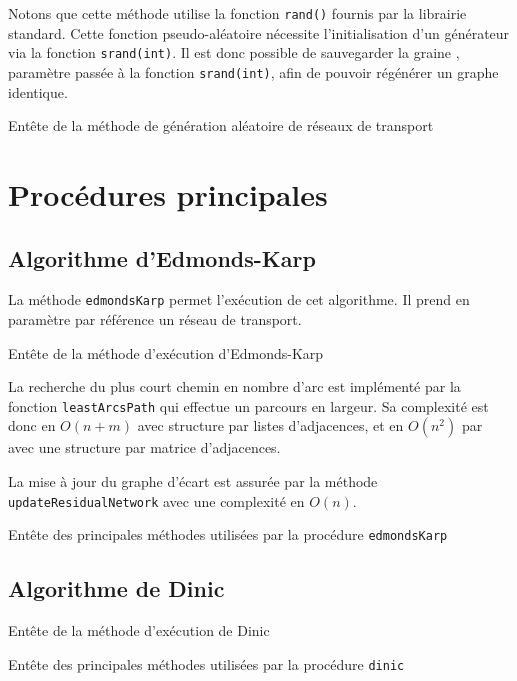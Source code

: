 Notons que cette méthode utilise la fonction \texttt{rand()} fournis par la librairie standard. Cette fonction \og pseudo-aléatoire \fg nécessite l'initialisation d'un générateur via la fonction \texttt{srand(int)}. Il est donc possible de sauvegarder la \og graine \fg, paramètre passée à la fonction \texttt{srand(int)}, afin de pouvoir régénérer un graphe identique.

Entête de la méthode de génération aléatoire de réseaux de transport


\section{Procédures principales}

\subsection{Algorithme d'Edmonds-Karp}

La méthode \texttt{edmondsKarp} permet l'exécution de cet algorithme. Il prend en paramètre par référence un réseau de transport.

Entête de la méthode d'exécution d'Edmonds-Karp


La recherche du plus court chemin en nombre d'arc est implémenté par la fonction \texttt{leastArcsPath} qui effectue un parcours en largeur. Sa complexité est donc en $O(n+m)$ avec structure par listes d'adjacences, et en $O(n^2)$ par avec une structure par matrice d'adjacences.

La mise à jour du graphe d'écart est assurée par la méthode \texttt{updateResidualNetwork} avec une complexité en $O(n)$.

Entête des principales méthodes utilisées par la procédure \texttt{edmondsKarp}


\subsection{Algorithme de Dinic}

Entête de la méthode d'exécution de Dinic


Entête des principales méthodes utilisées par la procédure \texttt{dinic}


